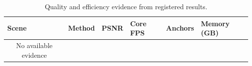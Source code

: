 \begin{table}[t]
\centering
\caption{Quality and efficiency evidence from registered results.}
\label{tab:supp_efficiency}
\begin{tabular}{llllll}
\toprule
Scene & Method & PSNR & Core FPS & Anchors & Memory (GB) \\
\midrule
\multicolumn{1}{c}{No available evidence} \\
\bottomrule
\end{tabular}
\end{table}
